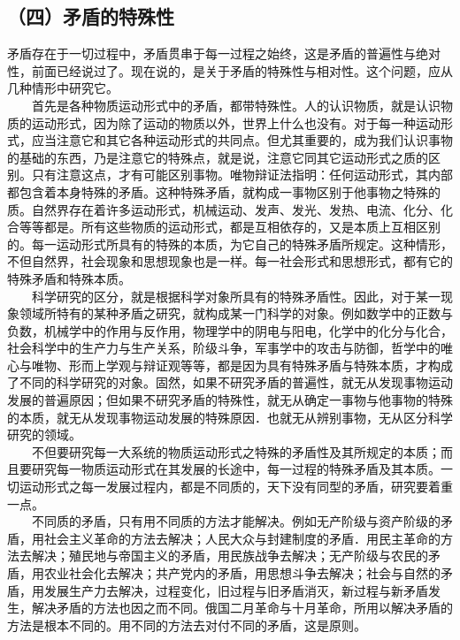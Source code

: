 \documentclass[cn,11pt,chinese]{elegantbook}
\def\myformat#1{\hfil\hfil #1}
\begin{document}
\subsection*{\myformat{（四）矛盾的特殊性}}
矛盾存在于一切过程中，矛盾贯串于每一过程之始终，这是矛盾的普遍性与绝对性，前面已经说过了。现在说的，是关于矛盾的特殊性与相对性。这个问题，应从几种情形中研究它。\\
　　首先是各种物质运动形式中的矛盾，都带特殊性。人的认识物质，就是认识物质的运动形式，因为除了运动的物质以外，世界上什么也没有。对于每一种运动形式，应当注意它和其它各种运动形式的共同点。但尤其重要的，成为我们认识事物的基础的东西，乃是注意它的特殊点，就是说，注意它同其它运动形式之质的区别。只有注意这点，才有可能区别事物。唯物辩证法指明：任何运动形式，其内部都包含着本身特殊的矛盾。这种特殊矛盾，就构成一事物区别于他事物之特殊的质。自然界存在着许多运动形式，机械运动、发声、发光、发热、电流、化分、化合等等都是。所有这些物质的运动形式，都是互相依存的，又是本质上互相区别的。每一运动形式所具有的特殊的本质，为它自己的特殊矛盾所规定。这种情形，不但自然界，社会现象和思想现象也是一样。每一社会形式和思想形式，都有它的特殊矛盾和特殊本质。\\
　　科学研究的区分，就是根据科学对象所具有的特殊矛盾性。因此，对于某一现象领域所特有的某种矛盾之研究，就构成某一门科学的对象。例如数学中的正数与负数，机械学中的作用与反作用，物理学中的阴电与阳电，化学中的化分与化合，社会科学中的生产力与生产关系，阶级斗争，军事学中的攻击与防御，哲学中的唯心与唯物、形而上学观与辩证观等等，都是因为具有特殊矛盾与特殊本质，才构成了不同的科学研究的对象。固然，如果不研究矛盾的普遍性，就无从发现事物运动发展的普遍原因；但如果不研究矛盾的特殊性，就无从确定一事物与他事物的特殊的本质，就无从发现事物运动发展的特殊原因．也就无从辨别事物，无从区分科学研究的领域。\\
　　不但要研究每一大系统的物质运动形式之特殊的矛盾性及其所规定的本质；而且要研究每一物质运动形式在其发展的长途中，每一过程的特殊矛盾及其本质。一切运动形式之每一发展过程内，都是不同质的，天下没有同型的矛盾，研究要着重一点。\\
　　不同质的矛盾，只有用不同质的方法才能解决。例如无产阶级与资产阶级的矛盾，用社会主义革命的方法去解决；人民大众与封建制度的矛盾．用民主革命的方法去解决；殖民地与帝国主义的矛盾，用民族战争去解决；无产阶级与农民的矛盾，用农业社会化去解决；共产党内的矛盾，用思想斗争去解决；社会与自然的矛盾，用发展生产力去解决，过程变化，旧过程与旧矛盾消灭，新过程与新矛盾发生，解决矛盾的方法也因之而不同。俄国二月革命与十月革命，所用以解决矛盾的方法是根本不同的。用不同的方法去对付不同的矛盾，这是原则。\\
\end{document}
